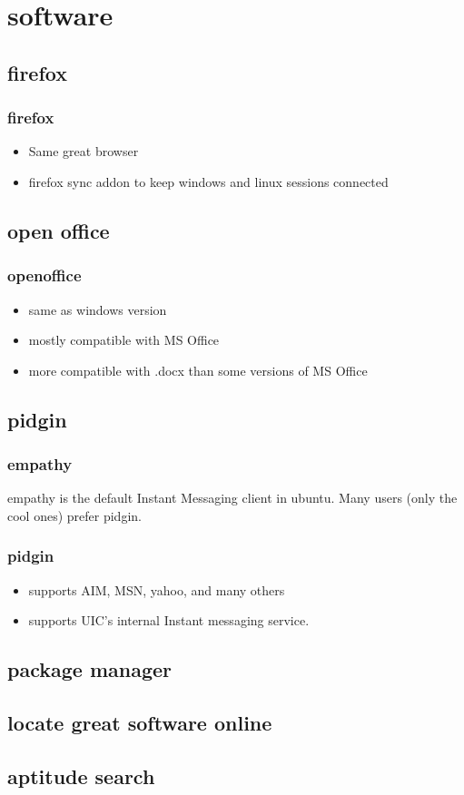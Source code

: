 \documentclass[hyperref={pdfpagelabels=false}]{beamer}
\begin{document}
\section{software}
\subsection{firefox}
\frame
{
    \frametitle{firefox}
    \begin{itemize}
    \item{Same great browser}
    \item{firefox sync addon to keep windows and linux sessions connected}
    \end{itemize}
}
\subsection{open office}
\frame
{
    \frametitle{openoffice}
    \begin{itemize}
    \item{same as windows version}
    \item{mostly compatible with MS Office}
    \item{more compatible with .docx than some versions of MS Office}
    \end{itemize}
}
\subsection{pidgin}
\frame
{
	\frametitle{empathy}
	empathy is the default Instant Messaging client in ubuntu.
        Many users (only the cool ones) prefer pidgin.
}
\frame
{
	\frametitle{pidgin}
	\begin{itemize}
	\item{supports AIM, MSN, yahoo, and many others}
	\item{supports UIC's internal Instant messaging service.}
	\end{itemize}
}
\subsection{package manager}
\frame
{
	\frametitle{ }


}
\subsection{locate great software online}
\subsection{aptitude search}
\end{document}
